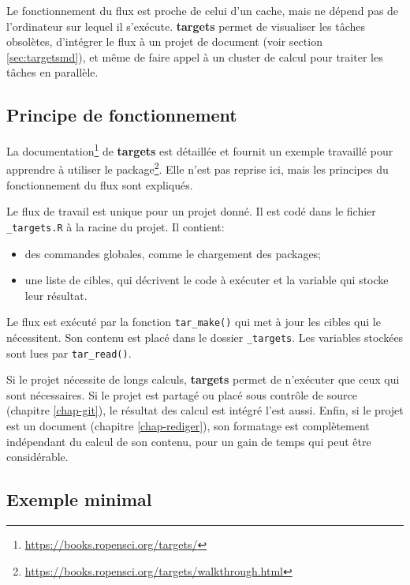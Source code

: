 \documentclass[
  12pt,
  french,
  a4paper,
  extrafontsizes,onecolumn,openright
  ]{memoir}
\providecommand{\tightlist}{%
  \setlength{\itemsep}{0pt}\setlength{\parskip}{0pt}}
\begin{document}
Le fonctionnement du flux est proche de celui d'un cache, mais ne dépend pas de l'ordinateur sur lequel il s'exécute.
\textbf{targets} permet de visualiser les tâches obsolètes, d'intégrer le flux à un projet de document (voir section \ref{sec:targetsmd}), et même de faire appel à un cluster de calcul pour traiter les tâches en parallèle.

\subsection{Principe de fonctionnement}\label{principe-de-fonctionnement}

La documentation\footnote{\url{https://books.ropensci.org/targets/}} de \textbf{targets} est détaillée et fournit un exemple travaillé pour apprendre à utiliser le package\footnote{\url{https://books.ropensci.org/targets/walkthrough.html}}.
Elle n'est pas reprise ici, mais les principes du fonctionnement du flux sont expliqués.

Le flux de travail est unique pour un projet donné.
Il est codé dans le fichier \texttt{\_targets.R} à la racine du projet.
Il contient:

\begin{itemize}
\tightlist
\item
  des commandes globales, comme le chargement des packages;
\item
  une liste de cibles, qui décrivent le code à exécuter et la variable qui stocke leur résultat.
\end{itemize}

Le flux est exécuté par la fonction \texttt{tar\_make()} qui met à jour les cibles qui le nécessitent.
Son contenu est placé dans le dossier \texttt{\_targets}.
Les variables stockées sont lues par \texttt{tar\_read()}.

Si le projet nécessite de longs calculs, \textbf{targets} permet de n'exécuter que ceux qui sont nécessaires.
Si le projet est partagé ou placé sous contrôle de source (chapitre \ref{chap-git}), le résultat des calcul est intégré l'est aussi.
Enfin, si le projet est un document (chapitre \ref{chap-rediger}), son formatage est complètement indépendant du calcul de son contenu, pour un gain de temps qui peut être considérable.

\subsection{Exemple minimal}\label{exemple-minimal}
\end{document}
